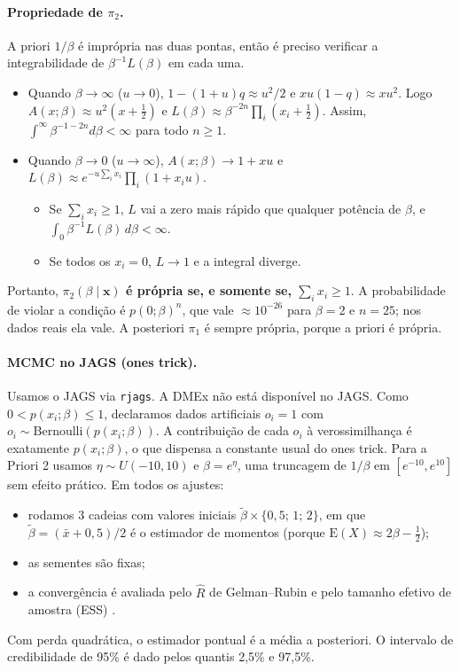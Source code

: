 \documentclass[11pt,a4paper]{article}
\newcommand{\E}{\mathrm{E}}
\begin{document}
\paragraph{Propriedade de $\pi_2$.} A priori $1/\beta$ é imprópria nas duas pontas, então é preciso verificar a integrabilidade de $\beta^{-1}L(\beta)$ em cada uma.
\begin{itemize}
\item Quando $\beta\to\infty$ ($u\to0$), $1-(1+u)q\approx u^2/2$ e $xu(1-q)\approx xu^2$. Logo $A(x;\beta)\approx u^2(x+\tfrac12)$ e $L(\beta)\approx\beta^{-2n}\prod_i(x_i+\tfrac12)$. Assim, $\int^\infty\beta^{-1-2n}d\beta<\infty$ para todo $n\ge1$.
\item Quando $\beta\to0$ ($u\to\infty$), $A(x;\beta)\to1+xu$ e $L(\beta)\approx e^{-u\sum_ix_i}\prod_i(1+x_iu)$.
  \begin{itemize}
  \item Se $\sum_ix_i\ge1$, $L$ vai a zero mais rápido que qualquer potência de $\beta$, e $\int_0\beta^{-1}L(\beta)\,d\beta<\infty$.
  \item Se todos os $x_i=0$, $L\to1$ e a integral diverge.
  \end{itemize}
\end{itemize}
Portanto, \textbf{$\pi_2(\beta\mid\mathbf x)$ é própria se, e somente se, $\sum_ix_i\ge1$}. A probabilidade de violar a condição é $p(0;\beta)^n$, que vale $\approx10^{-26}$ para $\beta=2$ e $n=25$; nos dados reais ela vale. A posteriori $\pi_1$ é sempre própria, porque a priori é própria.

\paragraph{MCMC no JAGS (ones trick).} Usamos o JAGS \cite{jags} via \texttt{rjags}. A DMEx não está disponível no JAGS. Como $0<p(x_i;\beta)\le1$, declaramos dados artificiais $o_i=1$ com $o_i\sim\text{Bernoulli}(p(x_i;\beta))$. A contribuição de cada $o_i$ à verossimilhança é exatamente $p(x_i;\beta)$, o que dispensa a constante usual do ones trick. Para a Priori 2 usamos $\eta\sim U(-10,10)$ e $\beta=e^\eta$, uma truncagem de $1/\beta$ em $[e^{-10},e^{10}]$ sem efeito prático. Em todos os ajustes:
\begin{itemize}
\item rodamos 3 cadeias com valores iniciais $\tilde\beta\times\{0{,}5;\,1;\,2\}$, em que $\tilde\beta=(\bar x+0{,}5)/2$ é o estimador de momentos (porque $\E(X)\approx2\beta-\tfrac12$);
\item as sementes são fixas;
\item a convergência é avaliada pelo $\hat R$ de Gelman--Rubin \cite{gelman1992} e pelo tamanho efetivo de amostra (ESS) \cite{coda}.
\end{itemize}
Com perda quadrática, o estimador pontual é a média a posteriori. O intervalo de credibilidade de 95\% é dado pelos quantis 2,5\% e 97,5\%.
\end{document}
